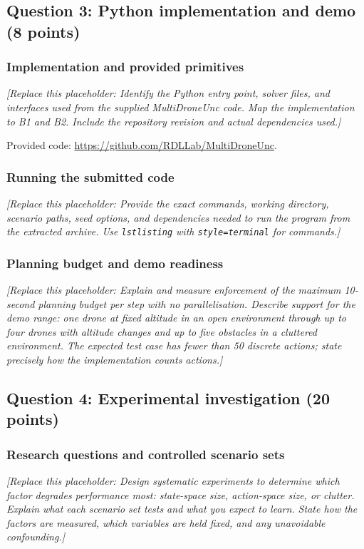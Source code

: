\documentclass[11pt,a4paper]{article}
\newcommand{\placeholder}[1]{%
  \par\smallskip
  \noindent\textcolor{placeholderGray}{\textit{[Replace this placeholder: #1]}}
  \par\smallskip
}
\begin{document}
\subsection*{Question 3: Python implementation and demo (8 points)}
\label{sec:b3}
\subsubsection*{Implementation and provided primitives}
\placeholder{Identify the Python entry point, solver files, and interfaces
used from the supplied MultiDroneUnc code. Map the implementation to B1 and
B2. Include the repository revision and actual dependencies used.}

\noindent Provided code:
\url{https://github.com/RDLLab/MultiDroneUnc}.

\subsubsection*{Running the submitted code}
\placeholder{Provide the exact commands, working directory, scenario paths,
seed options, and dependencies needed to run the program from the extracted
archive. Use \texttt{lstlisting} with \texttt{style=terminal} for commands.}

\subsubsection*{Planning budget and demo readiness}
\placeholder{Explain and measure enforcement of the maximum 10-second
planning budget per step with no parallelisation. Describe support for the
demo range: one drone at fixed altitude in an open environment through up to
four drones with altitude changes and up to five obstacles in a cluttered
environment. The expected test case has fewer than 50 discrete actions;
state precisely how the implementation counts actions.}

\subsection*{Question 4: Experimental investigation (20 points)}
\label{sec:b4}
\subsubsection*{Research questions and controlled scenario sets}
\placeholder{Design systematic experiments to determine which factor degrades
performance most: state-space size, action-space size, or clutter. Explain
what each scenario set tests and what you expect to learn. State how the
factors are measured, which variables are held fixed, and any unavoidable
confounding.}
\end{document}
